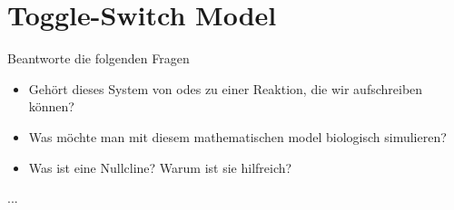 \section{Toggle-Switch Model}
%
%
Beantworte die folgenden Fragen
\begin{itemize}
    \item Gehört dieses System von \acp{ode} zu einer Reaktion, die wir aufschreiben können?
    \item Was möchte man mit diesem mathematischen model biologisch simulieren?
    \item Was ist eine Nullcline? Warum ist sie hilfreich?
\end{itemize}
%
%
...
%
%
